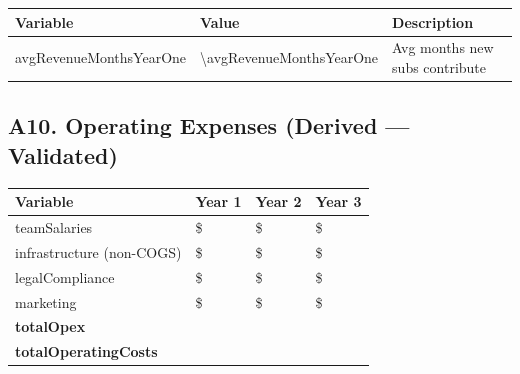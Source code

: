 \medskip
\begin{tabularx}{\linewidth}{l Y X}
\toprule
\textbf{Variable} & \textbf{Value} & \textbf{Description} \\\midrule
avgRevenueMonthsYearOne & \num{\avgRevenueMonthsYearOne} & Avg months new subs contribute \\
\bottomrule
\end{tabularx}

\subsection*{A10. Operating Expenses (Derived --- Validated)}
\begin{tabularx}{\linewidth}{l Y Y Y}
\toprule
\textbf{Variable} & \textbf{Year 1} & \textbf{Year 2} & \textbf{Year 3} \\\midrule
teamSalaries & \$\numint{\teamSalariesYearOne} & \$\numint{\teamSalariesYearTwo} & \$\numint{\teamSalariesYearThree} \\
infrastructure (non-COGS) & \$\numint{\infrastructureYearOne} & \$\numint{\infrastructureYearTwo} & \$\numint{\infrastructureYearThree} \\
legalCompliance & \$\numint{\legalComplianceYearOne} & \$\numint{\legalComplianceYearTwo} & \$\numint{\legalComplianceYearThree} \\
marketing & \$\numint{\marketingBudgetYearOne} & \$\numint{\marketingBudgetYearTwo} & \$\numint{\marketingBudgetYearThree} \\\midrule
\textbf{totalOpex} & \validatemoney{\totalOpexYearOne}{\HCtotalOpexYearOne} & \validatemoney{\totalOpexYearTwo}{\HCtotalOpexYearTwo} & \validatemoney{\totalOpexYearThree}{\HCtotalOpexYearThree} \\
\textbf{totalOperatingCosts} & \validatemoney{\totalOperatingCostsYearOne}{\HCtotalOperatingCostsYearOne} & \validatemoney{\totalOperatingCostsYearTwo}{\HCtotalOperatingCostsYearTwo} & \validatemoney{\totalOperatingCostsYearThree}{\HCtotalOperatingCostsYearThree} \\
\bottomrule
\end{tabularx}

